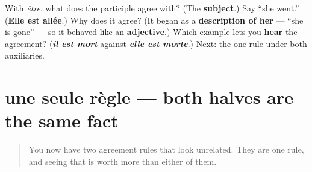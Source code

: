 \begin{tcolorbox}[breakable,colback=teal!4,colframe=teal!35!black,title={Before you move on}]
With \emph{être}, what does the participle agree with? (The \textbf{subject}.) Say \textquotedblleft{}she went.\textquotedblright{} (\textbf{Elle est allée}.) Why does it agree? (It began as a \textbf{description of her} — \textquotedblleft{}she is gone\textquotedblright{} — so it behaved like an \textbf{adjective}.) Which example lets you \textbf{hear} the agreement? (\emph{\textbf{il est mort}} against \emph{\textbf{elle est morte}}.) Next: the one rule under both auxiliaries.
\end{tcolorbox}
\section[une seule règle]{une seule règle — both halves are the same fact}

\label{lesson:FR-C16-accord-unifie}



\begin{quote}
You now have two agreement rules that look unrelated. They are one rule, and seeing that is worth more than either of them.
\end{quote}

